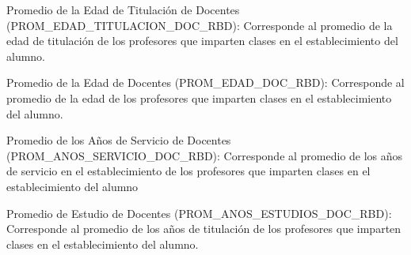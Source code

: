 \begin{longdescription}
\begin{longdescription}
                \item[Promedio de la Edad de Titulación de Docentes]
                (PROM\_EDAD\_TITULACION\_DOC\_RBD): Corresponde al promedio de la edad de titulación de los profesores que imparten clases en el establecimiento del alumno.
                
                \item[Promedio de la Edad de Docentes]
                (PROM\_EDAD\_DOC\_RBD): Corresponde al promedio de la edad de los profesores que imparten clases en el establecimiento del alumno.
                
                \item[Promedio de los Años de Servicio de Docentes]
                (PROM\_ANOS\_SERVICIO\_DOC\_RBD): Corresponde al promedio de los años de servicio en el establecimiento de los profesores que imparten clases en el establecimiento del alumno
                
                \item[Promedio de Estudio de Docentes]
                (PROM\_ANOS\_ESTUDIOS\_DOC\_RBD): Corresponde al promedio de los años de titulación de los profesores que imparten clases en el establecimiento del alumno.
                

\end{longdescription}
\end{longdescription}
